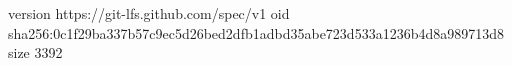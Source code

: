 version https://git-lfs.github.com/spec/v1
oid sha256:0c1f29ba337b57c9ec5d26bed2dfb1adbd35abe723d533a1236b4d8a989713d8
size 3392
